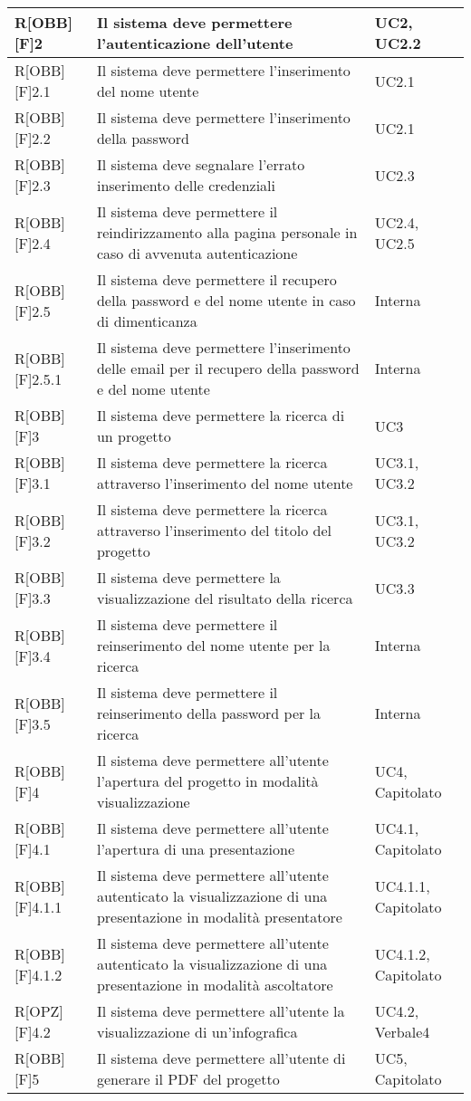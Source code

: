 \begin{table}[h]
		\begin{tabular}{|p{}|p{}|p{}|}
		\midrule

R[OBB][F]2 & Il sistema deve permettere l'autenticazione dell'utente & UC2, UC2.2 \\ \midrule
R[OBB][F]2.1 & Il sistema deve permettere l'inserimento del nome utente & UC2.1 \\ \midrule
R[OBB][F]2.2 & Il sistema deve permettere l'inserimento della password & UC2.1 \\ \midrule
R[OBB][F]2.3 & Il sistema deve segnalare l'errato inserimento delle credenziali & UC2.3 \\ \midrule
R[OBB][F]2.4 & Il sistema deve permettere il reindirizzamento alla pagina personale in caso di avvenuta autenticazione & UC2.4, UC2.5 \\ \midrule
R[OBB][F]2.5 & Il sistema deve permettere il recupero della password e del nome utente in caso di dimenticanza & Interna \\ \midrule
R[OBB][F]2.5.1 & Il sistema deve permettere l'inserimento delle email per il recupero della password e del nome utente & Interna \\ \midrule
R[OBB][F]3 & Il sistema deve permettere la ricerca di un progetto  & UC3 \\ \midrule
R[OBB][F]3.1 & Il sistema deve permettere la ricerca attraverso l'inserimento del nome utente & UC3.1, UC3.2 \\ \midrule
R[OBB][F]3.2 & Il sistema deve permettere la ricerca attraverso l'inserimento del titolo del progetto & UC3.1, UC3.2 \\ \midrule
R[OBB][F]3.3 & Il sistema deve permettere la visualizzazione del risultato della ricerca & UC3.3 \\ \midrule
R[OBB][F]3.4 & Il sistema deve permettere il reinserimento del nome utente per la ricerca & Interna \\ \midrule
R[OBB][F]3.5 & Il sistema deve permettere il reinserimento della password per la ricerca & Interna \\ \midrule
R[OBB][F]4 & Il sistema deve permettere all'utente l'apertura del progetto in modalità visualizzazione & UC4, Capitolato \\ \midrule
R[OBB][F]4.1 & Il sistema deve permettere all'utente l'apertura di una presentazione & UC4.1, Capitolato \\ \midrule
R[OBB][F]4.1.1 & Il sistema deve permettere all'utente autenticato la visualizzazione di una presentazione in modalità presentatore & UC4.1.1, Capitolato \\ \midrule
R[OBB][F]4.1.2 & Il sistema deve permettere all'utente autenticato la visualizzazione di una presentazione in modalità ascoltatore & UC4.1.2, Capitolato \\ \midrule
R[OPZ][F]4.2 & Il sistema deve permettere all'utente la visualizzazione di un'infografica & UC4.2, Verbale4 \\ \midrule
R[OBB][F]5 & Il sistema deve permettere all'utente di generare il PDF del progetto & UC5, Capitolato \\ \midrule


\end{tabular}
\end{table}
